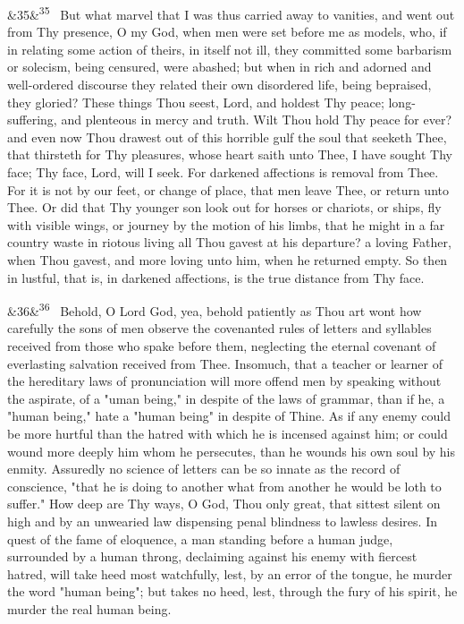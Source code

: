 \documentclass[12pt]{article}
\newcommand{\para}[1][]{\par\noindent\ifx&#1&\else\textsuperscript{\footnotesize #1}~\fi}
\begin{document}
\para[35] But what marvel that I was thus carried away to vanities, and went out from Thy presence, O my God, when men were set before me as models, who, if in relating some action of theirs, in itself not ill, they committed some barbarism or solecism, being censured, were abashed; but when in rich and adorned and well-ordered discourse they related their own disordered life, being bepraised, they gloried? These things Thou seest, Lord, and holdest Thy peace; long-suffering, and plenteous in mercy and truth. Wilt Thou hold Thy peace for ever? and even now Thou drawest out of this horrible gulf the soul that seeketh Thee, that thirsteth for Thy pleasures, whose heart saith unto Thee, I have sought Thy face; Thy face, Lord, will I seek. For darkened affections is removal from Thee. For it is not by our feet, or change of place, that men leave Thee, or return unto Thee. Or did that Thy younger son look out for horses or chariots, or ships, fly with visible wings, or journey by the motion of his limbs, that he might in a far country waste in riotous living all Thou gavest at his departure? a loving Father, when Thou gavest, and more loving unto him, when he returned empty. So then in lustful, that is, in darkened affections, is the true distance from Thy face.

\para[36] Behold, O Lord God, yea, behold patiently as Thou art wont how carefully the sons of men observe the covenanted rules of letters and syllables received from those who spake before them, neglecting the eternal covenant of everlasting salvation received from Thee. Insomuch, that a teacher or learner of the hereditary laws of pronunciation will more offend men by speaking without the aspirate, of a "uman being," in despite of the laws of grammar, than if he, a "human being," hate a "human being" in despite of Thine. As if any enemy could be more hurtful than the hatred with which he is incensed against him; or could wound more deeply him whom he persecutes, than he wounds his own soul by his enmity. Assuredly no science of letters can be so innate as the record of conscience, "that he is doing to another what from another he would be loth to suffer." How deep are Thy ways, O God, Thou only great, that sittest silent on high and by an unwearied law dispensing penal blindness to lawless desires. In quest of the fame of eloquence, a man standing before a human judge, surrounded by a human throng, declaiming against his enemy with fiercest hatred, will take heed most watchfully, lest, by an error of the tongue, he murder the word "human being"; but takes no heed, lest, through the fury of his spirit, he murder the real human being.
\end{document}
